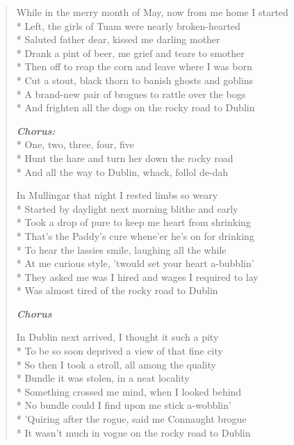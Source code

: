 \documentclass[9pt,twoside]{extarticle}
\newenvironment{xverse}{
	\begin{verse}
	\fontsize{8.5}{10.5}\selectfont
	}
	{
	\end{verse}
	\penalty 0
}
\newcommand{\chorusdef}{\textbf{\emph{Chorus:}}\\*}
\newcommand{\chorusmark}[1][1]{%
\vspace{-0.5\stanzaskip}%
\textbf{\emph{Chorus \ifthenelse{\equal{#1}{1}}{}{$\times$ #1}}}%
\vspace{-0.5\stanzaskip}%
}
\begin{document}
\begin{xverse}
While in the merry month of May, now from me home I started \\*
Left, the girls of Tuam were nearly broken-hearted \\*
Saluted father dear, kissed me darling mother \\*
Drank a pint of beer, me grief and tears to smother \\*
Then off to reap the corn and leave where I was born \\*
Cut a stout, black thorn to banish ghosts and goblins \\*
A brand-new pair of brogues to rattle over the bogs \\*
And frighten all the dogs on the rocky road to Dublin

\chorusdef
One, two, three, four, five \\*
Hunt the hare and turn her down the rocky road \\*
And all the way to Dublin, whack, follol de-dah

In Mullingar that night I rested limbs so weary \\*
Started by daylight next morning blithe and early \\*
Took a drop of pure to keep me heart from shrinking \\*
That’s the Paddy’s cure whene’er he’s on for drinking \\*
To hear the lassies smile, laughing all the while \\*
At me curious style, ’twould set your heart a-bubblin’ \\*
They asked me was I hired and wages I required to lay \\*
Was almost tired of the rocky road to Dublin

\chorusmark

In Dublin next arrived, I thought it such a pity \\*
To be so soon deprived a view of that fine city \\*
So then I took a stroll, all among the quality \\*
Bundle it was stolen, in a neat locality \\*
Something crossed me mind, when I looked behind \\*
No bundle could I find upon me stick a-wobblin’ \\*
’Quiring after the rogue, said me Connaught brogue \\*
It wasn’t much in vogue on the rocky road to Dublin


\end{xverse}
\end{document}
